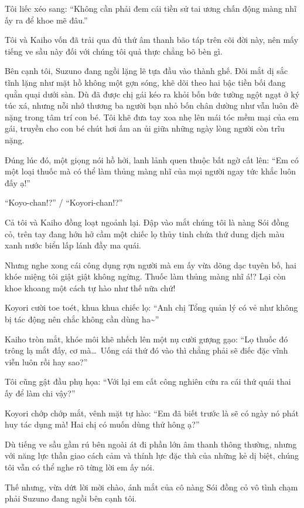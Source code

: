 \documentclass[../main.tex]{subfiles}
\begin{document}
Tôi liếc xéo sang: ``Không cần phải đem cái tiền sử tai ương chấn động màng nhĩ ấy ra để khoe mẽ đâu.''

Tôi và Kaiho vốn đã trải qua đủ thứ âm thanh bão táp trên cõi đời này, nên mấy tiếng ve sầu này đối với chúng tôi quả thực chẳng bõ bèn gì.

Bên cạnh tôi, Suzuno đang ngồi lặng lẽ tựa đầu vào thành ghế. Đôi mắt dị sắc tĩnh lặng như mặt hồ không một gợn sóng, khẽ dõi theo hai bậc tiền bối đang quằn quại dưới sàn. Dù đã được chị gái kéo ra khỏi bốn bức tường ngột ngạt ở ký túc xá, nhưng nỗi nhớ thương ba người bạn nhỏ bốn chân dường như vẫn luôn đè nặng trong tâm trí con bé. Tôi khẽ đưa tay xoa nhẹ lên mái tóc mềm mại của em gái, truyền cho con bé chút hơi ấm an ủi giữa những ngày lòng người còn trĩu nặng.

Đúng lúc đó, một giọng nói hồ hởi, lanh lảnh quen thuộc bất ngờ cất lên: ``Em có một loại thuốc mà có thể làm thủng màng nhĩ của mọi người ngay tức khắc luôn đấy ạ!''

``Koyo-chan!?'' / ``Koyori-chan!?''

Cả tôi và Kaiho đồng loạt ngoảnh lại. Đập vào mắt chúng tôi là nàng Sói đồng cỏ, trên tay đang hớn hở cầm một chiếc lọ thủy tinh chứa thứ dung dịch màu xanh nước biển lấp lánh đầy ma quái.


Nhưng nghe xong cái công dụng rợn người mà em ấy vừa dõng dạc tuyên bố, hai khóe miệng tôi giật giật không ngừng. Thuốc làm thủng màng nhĩ á!? Lại còn khoe khoang một cách tự hào như thế nữa chứ!

Koyori cười toe toét, khua khua chiếc lọ: ``Anh chị Tổng quản lý có vẻ như không bị tác động nên chắc không cần dùng ha\~{}''

Kaiho tròn mắt, khóe môi khẽ nhếch lên một nụ cười gượng gạo: ``Lọ thuốc đó trông lạ mắt đấy, cơ mà\dots\ Uống cái thứ đó vào thì chẳng phải sẽ điếc đặc vĩnh viễn luôn rồi hay sao?''

Tôi cũng gật đầu phụ họa: ``Với lại em cất công nghiên cứu ra cái thứ quái thai ấy để làm chi vậy?''

Koyori chớp chớp mắt, vênh mặt tự hào: ``Em đã biết trước là sẽ có ngày nó phát huy tác dụng mà! Hai chị có muốn dùng thử hông ạ?''

Dù tiếng ve sầu gầm rú bên ngoài át đi phần lớn âm thanh thông thường, nhưng với năng lực thần giao cách cảm và thính lực đặc thù của những kẻ dị biệt, chúng tôi vẫn có thể nghe rõ từng lời em ấy nói.

Thế nhưng, vừa dứt lời mời chào, ánh mắt của cô nàng Sói đồng cỏ vô tình chạm phải Suzuno đang ngồi bên cạnh tôi.
\end{document}
